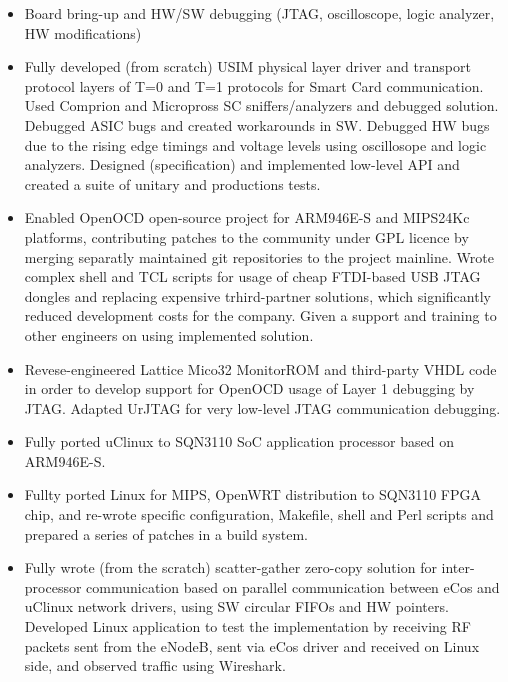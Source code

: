 \documentclass[a4paper, oneside, final]{scrartcl}
\begin{document}
\begin{itemize}
   \item Board bring-up and HW/SW debugging (JTAG, oscilloscope,
         logic analyzer, HW modifications)
   \item Fully developed (from scratch) USIM physical layer driver and
            transport protocol layers of T=0 and T=1 protocols for Smart Card
            communication. Used Comprion and Micropross SC sniffers/analyzers
            and debugged solution. Debugged ASIC bugs and created workarounds
            in SW. Debugged HW bugs due to the rising edge timings and voltage
            levels using oscillosope and logic analyzers. 
            Designed (specification) and implemented low-level API and 
            created a suite of unitary and productions tests.
   \item Enabled OpenOCD open-source project for ARM946E-S and MIPS24Kc
            platforms, contributing patches to the community under GPL
            licence by merging separatly maintained git repositories to the
            project mainline. Wrote complex shell and TCL scripts for usage of cheap
            FTDI-based USB JTAG dongles and replacing expensive trhird-partner solutions,
            which significantly reduced development costs for the company.
            Given a support and training to other engineers on using
            implemented solution. 
   \item Revese-engineered Lattice Mico32 MonitorROM and third-party VHDL code
            in order to develop support for OpenOCD usage of Layer 1 debugging by
            JTAG. Adapted UrJTAG for very low-level JTAG communication debugging.
   \item Fully ported uClinux to SQN3110 SoC application processor based on
            ARM946E-S.
   \item Fullty ported Linux for MIPS, OpenWRT distribution to SQN3110 FPGA
            chip, and re-wrote specific configuration, Makefile, shell and Perl scripts
            and prepared a series of patches in a build system.
   \item Fully wrote (from the scratch) scatter-gather zero-copy solution for
            inter-processor communication based on parallel communication between eCos
            and uClinux network drivers, using SW circular FIFOs and HW pointers.
            Developed Linux application to test the implementation by receiving
            RF packets sent from the eNodeB, sent via eCos driver and received
            on Linux side, and observed traffic using Wireshark.

\end{itemize}
\end{document}
